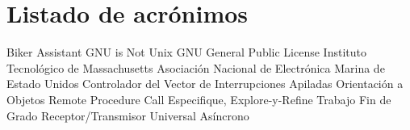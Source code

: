 \chapter{Listado de acrónimos}

{\small
\begin{acronym}[XXXXXXXX]
        {Biker Assistant}
       {\acs{GNU} is Not Unix}
       {\acs{GNU} General Public License}
       {Instituto Tecnológico de Massachusetts}
      {Asociación Nacional de Electrónica Marina de Estado Unidos}
      {Controlador del Vector de Interrupciones Apiladas}
        {Orientación a Objetos}
       {Remote Procedure Call}
       {Especifique, Explore-y-Refine}
       {Trabajo Fin de Grado}
     {Receptor/Transmisor Universal Asíncrono}
\end{acronym}
}




